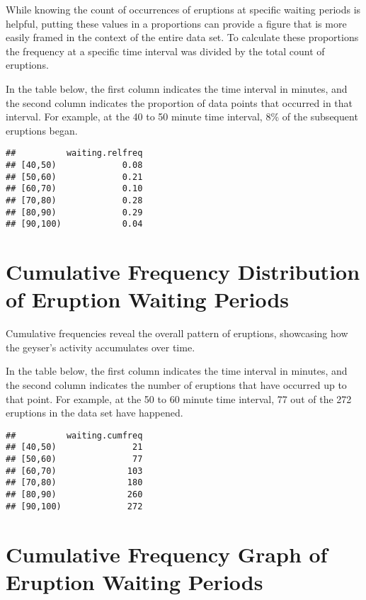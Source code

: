 \documentclass[
]{article}
\begin{document}
While knowing the count of occurrences of eruptions at specific waiting
periods is helpful, putting these values in a proportions can provide a
figure that is more easily framed in the context of the entire data set.
To calculate these proportions the frequency at a specific time interval
was divided by the total count of eruptions.

In the table below, the first column indicates the time interval in
minutes, and the second column indicates the proportion of data points
that occurred in that interval. For example, at the 40 to 50 minute time
interval, 8\% of the subsequent eruptions began.

\begin{verbatim}
##          waiting.relfreq
## [40,50)             0.08
## [50,60)             0.21
## [60,70)             0.10
## [70,80)             0.28
## [80,90)             0.29
## [90,100)            0.04
\end{verbatim}

\hypertarget{cumulative-frequency-distribution-of-eruption-waiting-periods}{%
\section{Cumulative Frequency Distribution of Eruption Waiting
Periods}\label{cumulative-frequency-distribution-of-eruption-waiting-periods}}

Cumulative frequencies reveal the overall pattern of eruptions,
showcasing how the geyser's activity accumulates over time.

In the table below, the first column indicates the time interval in
minutes, and the second column indicates the number of eruptions that
have occurred up to that point. For example, at the 50 to 60 minute time
interval, 77 out of the 272 eruptions in the data set have happened.

\begin{verbatim}
##          waiting.cumfreq
## [40,50)               21
## [50,60)               77
## [60,70)              103
## [70,80)              180
## [80,90)              260
## [90,100)             272
\end{verbatim}

\hypertarget{cumulative-frequency-graph-of-eruption-waiting-periods}{%
\section{Cumulative Frequency Graph of Eruption Waiting
Periods}\label{cumulative-frequency-graph-of-eruption-waiting-periods}}
\end{document}
